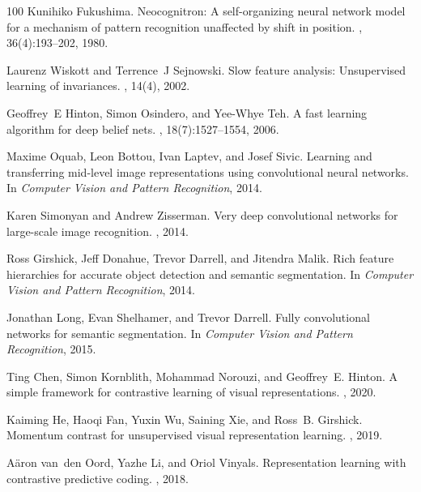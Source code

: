 \documentclass{article}
\begin{document}
{
    \small
   \begin{thebibliography}{100}
Kunihiko Fukushima.
\newblock Neocognitron: A self-organizing neural network model for a mechanism
  of pattern recognition unaffected by shift in position.
, 36(4):193--202, 1980.

Laurenz Wiskott and Terrence~J Sejnowski.
\newblock Slow feature analysis: Unsupervised learning of invariances.
, 14(4), 2002.

Geoffrey~E Hinton, Simon Osindero, and Yee-Whye Teh.
\newblock A fast learning algorithm for deep belief nets.
, 18(7):1527--1554, 2006.

Maxime Oquab, Leon Bottou, Ivan Laptev, and Josef Sivic.
\newblock Learning and transferring mid-level image representations using
  convolutional neural networks.
\newblock In {\em Computer Vision and Pattern Recognition}, 2014.

Karen Simonyan and Andrew Zisserman.
\newblock Very deep convolutional networks for large-scale image recognition.
, 2014.

Ross Girshick, Jeff Donahue, Trevor Darrell, and Jitendra Malik.
\newblock Rich feature hierarchies for accurate object detection and semantic
  segmentation.
\newblock In {\em Computer Vision and Pattern Recognition}, 2014.

Jonathan Long, Evan Shelhamer, and Trevor Darrell.
\newblock Fully convolutional networks for semantic segmentation.
\newblock In {\em Computer Vision and Pattern Recognition}, 2015.

Ting Chen, Simon Kornblith, Mohammad Norouzi, and Geoffrey~E. Hinton.
\newblock A simple framework for contrastive learning of visual
  representations.
, 2020.

Kaiming He, Haoqi Fan, Yuxin Wu, Saining Xie, and Ross~B. Girshick.
\newblock Momentum contrast for unsupervised visual representation learning.
, 2019.

A{\"a}ron van~den Oord, Yazhe Li, and Oriol Vinyals.
\newblock Representation learning with contrastive predictive coding.
, 2018.


\end{thebibliography}}
\end{document}
